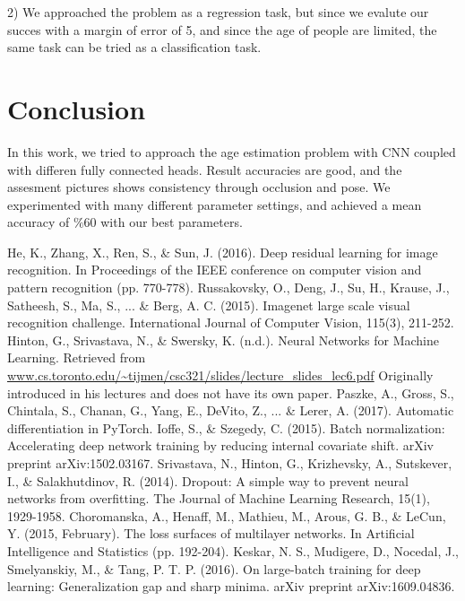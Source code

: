\documentclass[conference,compsoc]{IEEEtran}
\begin{document}
2) We approached the problem as a regression task, but since we evalute our succes with a margin of error of 5, and since the age of people are limited, the same task can be tried as a classification task.

\section{Conclusion}

In this work, we tried to approach the age estimation problem with CNN coupled with differen fully connected heads. Result accuracies are good, and the assesment pictures shows consistency through occlusion and pose. We experimented with many different parameter settings, and achieved a mean accuracy of $\%60$ with our best parameters.

\begin{thebibliography}{1}


	He, K., Zhang, X., Ren, S., \& Sun, J. (2016). Deep residual learning for image recognition. In Proceedings of the IEEE conference on computer vision and pattern recognition (pp. 770-778).
	Russakovsky, O., Deng, J., Su, H., Krause, J., Satheesh, S., Ma, S., ... \& Berg, A. C. (2015). Imagenet large scale visual recognition challenge. International Journal of Computer Vision, 115(3), 211-252.
	Hinton, G., Srivastava, N., \& Swersky, K. (n.d.). Neural Networks for Machine Learning. Retrieved from \url{www.cs.toronto.edu/~tijmen/csc321/slides/lecture_slides_lec6.pdf}
Originally introduced in his lectures and does not have its own paper.
	Paszke, A., Gross, S., Chintala, S., Chanan, G., Yang, E., DeVito, Z., ... \& Lerer, A. (2017). Automatic differentiation in PyTorch.
	Ioffe, S., \& Szegedy, C. (2015). Batch normalization: Accelerating deep network training by reducing internal covariate shift. arXiv preprint arXiv:1502.03167.
	Srivastava, N., Hinton, G., Krizhevsky, A., Sutskever, I., \& Salakhutdinov, R. (2014). Dropout: A simple way to prevent neural networks from overfitting. The Journal of Machine Learning Research, 15(1), 1929-1958.
	Choromanska, A., Henaff, M., Mathieu, M., Arous, G. B., \& LeCun, Y. (2015, February). The loss surfaces of multilayer networks. In Artificial Intelligence and Statistics (pp. 192-204).
	Keskar, N. S., Mudigere, D., Nocedal, J., Smelyanskiy, M., \& Tang, P. T. P. (2016). On large-batch training for deep learning: Generalization gap and sharp minima. arXiv preprint arXiv:1609.04836.
\end{thebibliography}
\end{document}
